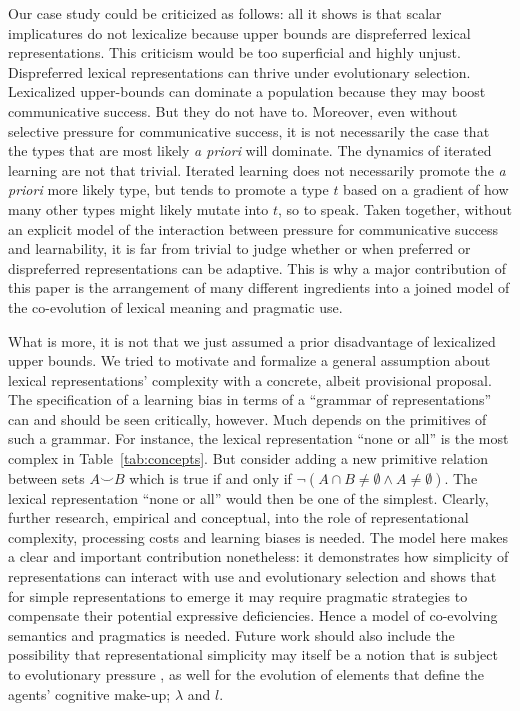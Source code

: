 \documentclass[a4paper, 11pt]{article}
\theoremstyle{Satz}
\begin{document}
Our case study could be criticized as follows: all it shows is that scalar implicatures do not
lexicalize because upper bounds are dispreferred lexical representations. This criticism would be too
superficial and highly unjust. Dispreferred lexical representations can thrive under evolutionary
selection. Lexicalized upper-bounds can dominate a population because they may boost
communicative success. But they do not have to. Moreover, even without selective pressure
for communicative success, it is not necessarily the case that the types that are most
likely \emph{a priori} will dominate. The dynamics of iterated learning are not that
trivial. Iterated learning does not necessarily promote the \emph{a priori} more likely type,
but tends to promote a type $t$ based on a gradient of how many other types might likely mutate
into $t$, so to speak. Taken together, without an explicit model of the interaction between
pressure for communicative success and learnability, it is far from trivial to judge whether or when
preferred or dispreferred representations can be adaptive. This is why a major contribution of this
paper is the arrangement of many different ingredients into a joined model of the co-evolution
of lexical meaning and pragmatic use. 

What is more, it is not that we just assumed a prior disadvantage of lexicalized upper
bounds. We tried to motivate and formalize a general assumption about lexical representations'
complexity with a concrete, albeit provisional proposal. The specification of a learning bias
in terms of a ``grammar of representations'' can and should be seen critically, however. Much
depends on the primitives of such a grammar. For instance, the lexical representation ``none or
all'' is the most complex in Table~\ref{tab:concepts}. But consider adding a new primitive
relation between sets $A \smile B$ which is true if and only if
$\neg(A \cap B \neq \emptyset \wedge A \neq \emptyset)$. The lexical representation ``none or
all'' would then be one of the simplest. Clearly, further research, empirical and conceptual,
into the role of representational complexity, processing costs and learning biases is
needed. The model here makes a clear and important contribution nonetheless: it demonstrates
how simplicity of representations can interact with use and evolutionary selection and shows
that for simple representations to emerge it may require pragmatic strategies to compensate
their potential expressive deficiencies. Hence a model of co-evolving semantics and pragmatics is
needed. Future work should also include the possibility that representational simplicity may
itself be a notion that is subject to evolutionary pressure
\citep[cf.][]{ThompsonKirby2016:Culture-Shapes-}, as well for the evolution of elements that define
the agents' cognitive make-up; $\lambda$ and $l$.
\end{document}
